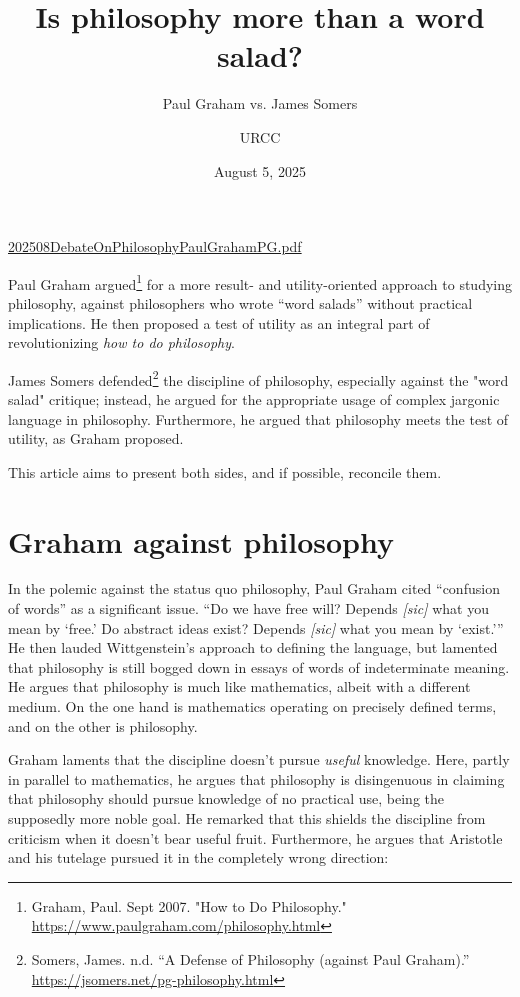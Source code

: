 \documentclass[12pt]{article}
\begin{document}
\title{Is philosophy more than a word salad?}
\subtitle{Paul Graham vs. James Somers}  %
\author{URCC}
\date{August 5, 2025}
\maketitle

\href{202508DebateOnPhilosophyPaulGrahamPG.pdf}{202508DebateOnPhilosophyPaulGrahamPG.pdf}

\begin{preamble}
 Paul Graham argued\footnote{Graham, Paul. Sept 2007. "How to Do Philosophy." \href{https://www.paulgraham.com/philosophy.html}{https://www.paulgraham.com/philosophy.html}} for a more result- and utility-oriented approach to studying philosophy, against philosophers who wrote  ``word salads'' without practical implications. He then proposed a test of utility as an integral part of revolutionizing \emph{how to do philosophy}.

 James Somers defended\footnote{Somers, James. n.d. \enquote{A Defense of Philosophy (against Paul Graham).} \href{https://jsomers.net/pg-philosophy.html}{https://jsomers.net/pg-philosophy.html}} the discipline of philosophy, especially against the "word salad" critique; instead, he argued for the appropriate usage of complex jargonic language in philosophy. Furthermore, he argued that philosophy meets the test of utility, as Graham proposed.

 This article aims to present both sides, and if possible, reconcile them.
\end{preamble}

\section{Graham against philosophy}

In the polemic against the status quo philosophy, Paul Graham cited \enquote{confusion of words} as a significant issue. \enquote{Do we have free will? Depends \emph{[sic]} what you mean by \enquote{free.} Do abstract ideas exist? Depends \emph{[sic]} what you mean by \enquote{exist.}} He then lauded Wittgenstein's approach to defining the language, but lamented that philosophy is still bogged down in essays of words of indeterminate meaning. He argues that philosophy is much like mathematics, albeit with a different medium. On the one hand is mathematics operating on precisely defined terms, and on the other is philosophy.

Graham laments that the discipline doesn't pursue \emph{useful} knowledge. Here, partly in parallel to mathematics, he argues that philosophy is disingenuous in claiming that philosophy should pursue knowledge of no practical use, being the supposedly more noble goal. He remarked that this shields the discipline from criticism when it doesn't bear useful fruit. Furthermore, he argues that Aristotle and his tutelage pursued it in the completely wrong direction:
\end{document}
